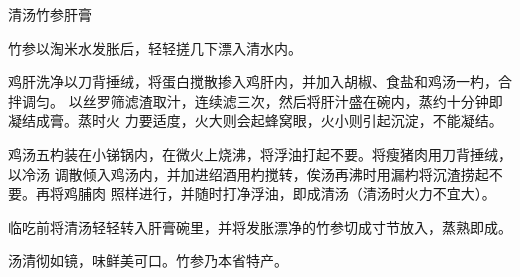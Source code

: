 \begin{recipe}{清汤竹参肝膏}

\ingredients


\preparation

竹参以淘米水发胀后，轻轻搓几下漂入清水内。

鸡肝洗净以刀背捶绒，将蛋白搅散掺入鸡肝内，并加入胡椒、食盐和鸡汤一杓，合拌调匀。
以丝罗筛滤渣取汁，连续滤三次，然后将肝汁盛在碗内，蒸约十分钟即凝结成膏。蒸时火
力要适度，火大则会起蜂窝眼，火小则引起沉淀，不能凝结。

鸡汤五杓装在小锑锅内，在微火上烧沸，将浮油打起不要。将瘦猪肉用刀背捶绒，以冷汤
调散倾入鸡汤内，并加进绍酒用杓搅转，俟汤再沸时用漏杓将沉渣捞起不要。再将鸡脯肉
照样进行，并随时打净浮油，即成清汤（清汤时火力不宜大）。

临吃前将清汤轻轻转入肝膏碗里，并将发胀漂净的竹参切成寸节放入，蒸熟即成。

\features

汤清彻如镜，味鲜美可口。竹参乃本省特产。

\end{recipe}

